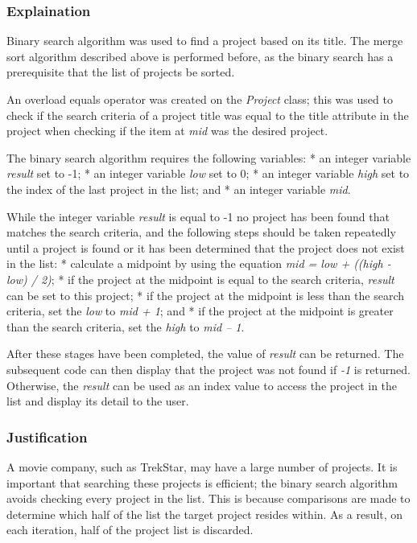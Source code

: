 \documentclass[
  english,
  a4paper,
,tablecaptionabove
]{scrartcl}
\begin{document}
\hypertarget{explaination-1}{%
\subsubsection{Explaination}\label{explaination-1}}

Binary search algorithm was used to find a project based on its title.
The merge sort algorithm described above is performed before, as the
binary search has a prerequisite that the list of projects be sorted.

An overload equals operator was created on the \emph{Project} class;
this was used to check if the search criteria of a project title was
equal to the title attribute in the project when checking if the item at
\emph{mid} was the desired project.

The binary search algorithm requires the following variables: * an
integer variable \emph{result} set to -1; * an integer variable
\emph{low} set to 0; * an integer variable \emph{high} set to the index
of the last project in the list; and * an integer variable \emph{mid}.

While the integer variable \emph{result} is equal to -1 no project has
been found that matches the search criteria, and the following steps
should be taken repeatedly until a project is found or it has been
determined that the project does not exist in the list: * calculate a
midpoint by using the equation \emph{mid = low + ((high - low) / 2)}; *
if the project at the midpoint is equal to the search criteria,
\emph{result} can be set to this project; * if the project at the
midpoint is less than the search criteria, set the \emph{low} to
\emph{mid + 1}; and * if the project at the midpoint is greater than the
search criteria, set the \emph{high} to \emph{mid -- 1}.

After these stages have been completed, the value of \emph{result} can
be returned. The subsequent code can then display that the project was
not found if \emph{-1} is returned. Otherwise, the \emph{result} can be
used as an index value to access the project in the list and display its
detail to the user.

\hypertarget{justification-1}{%
\subsubsection{Justification}\label{justification-1}}

A movie company, such as TrekStar, may have a large number of projects.
It is important that searching these projects is efficient; the binary
search algorithm avoids checking every project in the list. This is
because comparisons are made to determine which half of the list the
target project resides within. As a result, on each iteration, half of
the project list is discarded.
\end{document}
